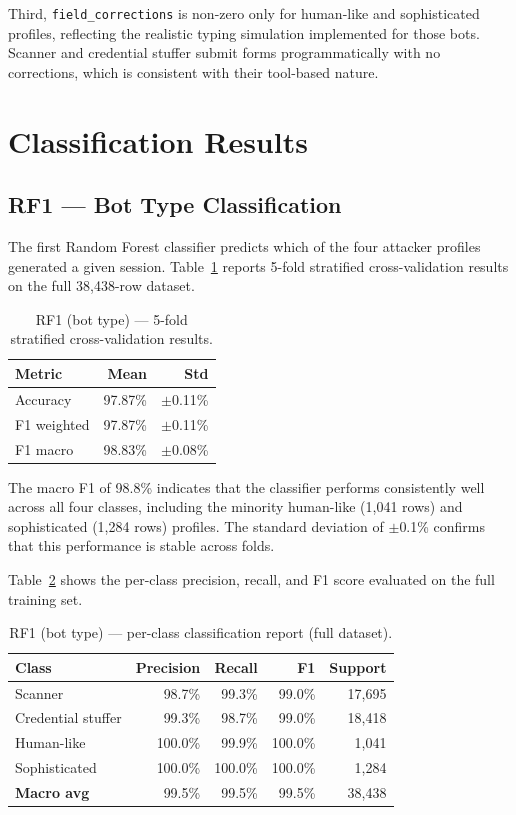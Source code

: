 Third, \texttt{field\_corrections} is non-zero only for human-like and
sophisticated profiles, reflecting the realistic typing simulation
implemented for those bots. Scanner and credential stuffer submit forms
programmatically with no corrections, which is consistent with their
tool-based nature.

\section{Classification Results}

\subsection{RF1 — Bot Type Classification}

The first Random Forest classifier predicts which of the four attacker
profiles generated a given session. Table~\ref{tab:rf1_cv} reports
5-fold stratified cross-validation results on the full 38,438-row dataset.

\begin{table}[h]
\centering
\caption{RF1 (bot type) — 5-fold stratified cross-validation results.}
\label{tab:rf1_cv}
\begin{tabular}{lrr}
\hline
\textbf{Metric} & \textbf{Mean} & \textbf{Std} \\
\hline
Accuracy    & 97.87\% & $\pm$0.11\% \\
F1 weighted & 97.87\% & $\pm$0.11\% \\
F1 macro    & 98.83\% & $\pm$0.08\% \\
\hline
\end{tabular}
\end{table}

The macro F1 of 98.8\% indicates that the classifier performs
consistently well across all four classes, including the minority
human-like (1,041 rows) and sophisticated (1,284 rows) profiles. The standard
deviation of $\pm$0.1\% confirms that this performance is stable across
folds.

Table~\ref{tab:rf1_report} shows the per-class precision, recall, and
F1 score evaluated on the full training set.

\begin{table}[h]
\centering
\caption{RF1 (bot type) — per-class classification report (full dataset).}
\label{tab:rf1_report}
\begin{tabular}{lrrrr}
\hline
\textbf{Class} & \textbf{Precision} & \textbf{Recall} & \textbf{F1} & \textbf{Support} \\
\hline
Scanner            & 98.7\% & 99.3\% & 99.0\% & 17,695 \\
Credential stuffer & 99.3\% & 98.7\% & 99.0\% & 18,418 \\
Human-like         & 100.0\% & 99.9\% & 100.0\% & 1,041  \\
Sophisticated      & 100.0\% & 100.0\% & 100.0\% & 1,284  \\
\hline
\textbf{Macro avg} & 99.5\% & 99.5\% & 99.5\% & 38,438 \\
\hline
\end{tabular}
\end{table}


